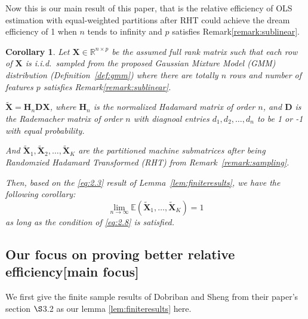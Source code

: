 \documentclass[11pt]{article}
\numberwithin{equation}{section}
\theoremstyle{plain}
\newtheorem{corollary}[theorem]{Corollary}
\theoremstyle{definition}
\theoremstyle{remark}
\begin{document}
Now this is our main result of this paper, that is the relative efficiency of OLS estimation with equal-weighted partitions after RHT could achieve the dream efficiency of 1 when $n$ tends to infinity and $p$ satisfies Remark\ref{remark:sublinear}.
\begin{corollary}
  \label{corollary:main}
  Let $\mathbf{X}\in\mathbb{R}^{n\times p}$ be the assumed full rank matrix such that each row of $\mathbf{X}$ is i.i.d.\ sampled from the proposed Gaussian Mixture Model (GMM) distribution (Definition~\ref{def:gmm}) where there are totally $n$ rows and number of features $p$ satisfies Remark\ref{remark:sublinear}.

  $\mathbf{\tilde{X}} = \mathbf{H}_n\mathbf{D}\mathbf{X}$, where $\mathbf{H}_n$ is the normalized Hadamard matrix of order $n$, and $\mathbf{D}$ is the Rademacher matrix of order $n$ with diagnoal entries $d_1, d_2, \ldots, d_n$ to be 1 or -1 with equal probability.

  And $\mathbf{\tilde{X}}_{1}, \mathbf{\tilde{X}}_{2}, \ldots, \mathbf{\tilde{X}}_{K}$ are the partitioned machine submatrices after being Randomzied Hadamard Transformed (RHT) from Remark~\ref{remark:sampling}.

  Then, based on the \ref{eq:2.3} result of Lemma~\ref{lem:finiteresults}, we have the following corollary:
  \[
    \lim_{n\to\infty}\mathbb{E}(\mathbf{\tilde{X}}_1,\ldots,\mathbf{\tilde{X}}_K) = 1
  \]
  as long as the condition of \ref{eq:2.8} is satisfied.
\end{corollary}
\subsection{Our focus on proving better relative efficiency[main focus]}
We first give the finite sample results of Dobriban and Sheng \cite{dobriban2022distributedlinearregressionaveraging} from their paper's section $\S$3.2 as our lemma \ref{lem:finiteresults} here.
\end{document}
